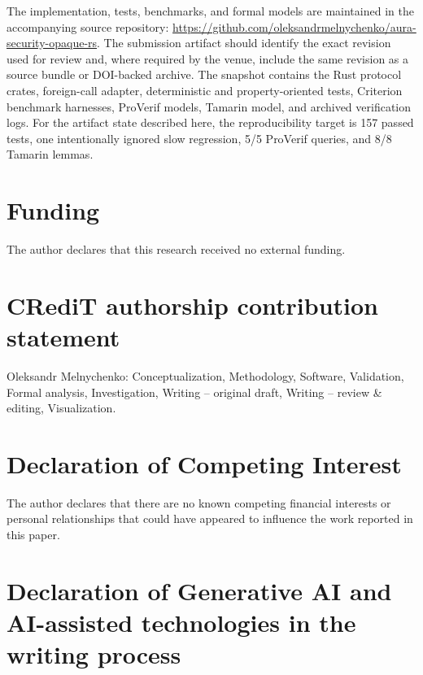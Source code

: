 \documentclass[preprint,12pt]{elsarticle}
\theoremstyle{remark}
\begin{document}
The implementation, tests, benchmarks, and formal models are maintained
in the accompanying source repository:
\url{https://github.com/oleksandrmelnychenko/aura-security-opaque-rs}.
The submission artifact should identify the exact revision used for
review and, where required by the venue, include the same revision as a
source bundle or DOI-backed archive. The snapshot contains the Rust
protocol crates, foreign-call adapter, deterministic and
property-oriented tests, Criterion benchmark harnesses, ProVerif models,
Tamarin model, and archived verification logs. For the artifact state
described here, the reproducibility target is 157 passed tests, one
intentionally ignored slow regression, 5/5 ProVerif queries, and 8/8
Tamarin lemmas.

\section*{Funding}

The author declares that this research received no external funding.

\section*{CRediT authorship contribution statement}

Oleksandr Melnychenko: Conceptualization, Methodology, Software,
Validation, Formal analysis, Investigation, Writing -- original draft,
Writing -- review \& editing, Visualization.

\section*{Declaration of Competing Interest}

The author declares that there are no known competing financial
interests or personal relationships that could have appeared to
influence the work reported in this paper.

\section*{Declaration of Generative AI and AI-assisted technologies in the writing process}
\end{document}
